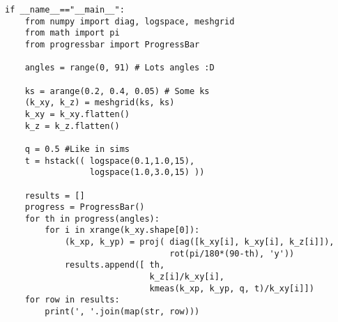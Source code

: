 \begin{verbatim}
if __name__=="__main__":
    from numpy import diag, logspace, meshgrid
    from math import pi
    from progressbar import ProgressBar

    angles = range(0, 91) # Lots angles :D

    ks = arange(0.2, 0.4, 0.05) # Some ks
    (k_xy, k_z) = meshgrid(ks, ks)
    k_xy = k_xy.flatten()
    k_z = k_z.flatten()

    q = 0.5 #Like in sims
    t = hstack(( logspace(0.1,1.0,15),
                 logspace(1.0,3.0,15) ))

    results = []
    progress = ProgressBar()
    for th in progress(angles):
        for i in xrange(k_xy.shape[0]):
            (k_xp, k_yp) = proj( diag([k_xy[i], k_xy[i], k_z[i]]),
                                 rot(pi/180*(90-th), 'y'))
            results.append([ th,
                             k_z[i]/k_xy[i],
                             kmeas(k_xp, k_yp, q, t)/k_xy[i]])
    for row in results:
        print(', '.join(map(str, row)))
\end{verbatim}
\normalsize
